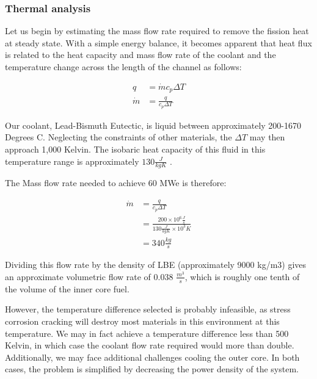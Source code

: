 \documentclass[12pt]{article}
\begin{document}
\subsubsection{Thermal analysis}
Let us begin by estimating the mass flow rate required to remove the fission heat at steady state. With a simple energy balance, it becomes apparent that heat flux is related to the heat capacity and mass flow rate of the coolant and the temperature change across the length of the channel as follows:

\begin{align}
q &= \dot{m} c_p \Delta T \\
\dot{m} &= \frac{q}{c_p \Delta T}
\end{align}


Our coolant, Lead-Bismuth Eutectic, is liquid between approximately 200-1670 Degrees C. Neglecting the constraints of other materials, the $\Delta T$ may then approach 1,000 Kelvin. The isobaric heat capacity of this fluid in this temperature range is approximately $130 \frac{J}{kg K}$ \cite{LBE_properties}. 

The Mass flow rate needed to achieve 60 MWe is therefore:

\begin{align}
\dot{m} &= \frac{q}{c_p \Delta T} \\
 &= \frac{200 \times 10^6 \frac{J}{s}}{130 \frac{J}{kg K} \times 10^3 K} \\
 &= 340 \frac{kg}{s}
\end{align} 

Dividing this flow rate by the density of LBE (approximately 9000 kg/m3) gives an approximate volumetric flow rate of 0.038 $\frac{m^3}{s}$, which is roughly one tenth of the volume of the inner core fuel.

However, the temperature difference selected is probably infeasible, as stress corrosion cracking will destroy most materials in this environment at this temperature. We may in fact achieve a temperature difference less than 500 Kelvin, in which case the coolant flow rate required would more than double. Additionally, we may face additional challenges cooling the outer core. In both cases, the problem is simplified by decreasing the power density of the system. 
\end{document}
